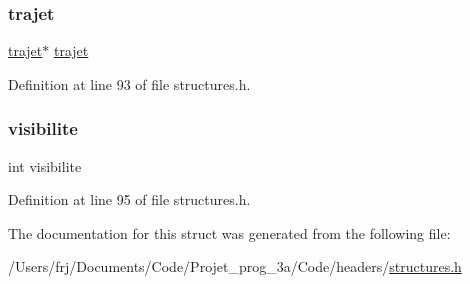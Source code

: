 \hypertarget{structbdd__trace_ad417eb03de659793c712421b340fbec4}{}\label{structbdd__trace_ad417eb03de659793c712421b340fbec4} 
\subsubsection{\texorpdfstring{trajet}{trajet}}
{\footnotesize\ttfamily \hyperlink{structtrajet}{trajet}$\ast$ \hyperlink{structtrajet}{trajet}}



Definition at line 93 of file structures.\+h.

\hypertarget{structbdd__trace_aa34b47a3ed3a7dfed8a672132bcc3f2a}{}\label{structbdd__trace_aa34b47a3ed3a7dfed8a672132bcc3f2a} 
\subsubsection{\texorpdfstring{visibilite}{visibilite}}
{\footnotesize\ttfamily int visibilite}



Definition at line 95 of file structures.\+h.



The documentation for this struct was generated from the following file\+:\begin{DoxyCompactItemize}
\item 
/\+Users/frj/\+Documents/\+Code/\+Projet\+\_\+prog\+\_\+3a/\+Code/headers/\hyperlink{structures_8h}{structures.\+h}\end{DoxyCompactItemize}
